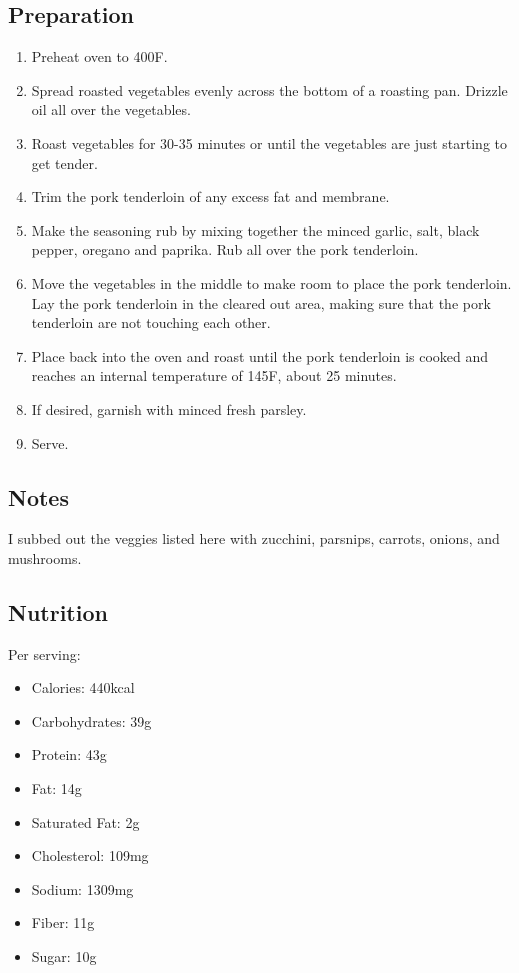 \subsection{Preparation}
\begin{enumerate}
    \item Preheat oven to 400F.
    \item Spread roasted vegetables evenly across the bottom of a roasting pan. Drizzle oil all over the vegetables.
    \item Roast vegetables for 30-35 minutes or until the vegetables are just starting to get tender.
    \item Trim the pork tenderloin of any excess fat and membrane.
    \item Make the seasoning rub by mixing together the minced garlic, salt, black pepper, oregano and paprika. Rub all over the pork tenderloin.
    \item Move the vegetables in the middle to make room to place the pork tenderloin. Lay the pork tenderloin in the cleared out area, making sure that the pork tenderloin are not touching each other.
    \item Place back into the oven and roast until the pork tenderloin is cooked and reaches an internal temperature of 145F, about 25 minutes.
    \item If desired, garnish with minced fresh parsley.
    \item Serve.
\end{enumerate}

\subsection{Notes}
I subbed out the veggies listed here with zucchini, parsnips, carrots, onions, and mushrooms.

\subsection{Nutrition}
Per serving:

\begin{itemize}
    \item Calories: 440kcal
    \item Carbohydrates: 39g
    \item Protein: 43g
    \item Fat: 14g
    \item Saturated Fat: 2g
    \item Cholesterol: 109mg
    \item Sodium: 1309mg
    \item Fiber: 11g
    \item Sugar: 10g
\end{itemize}
